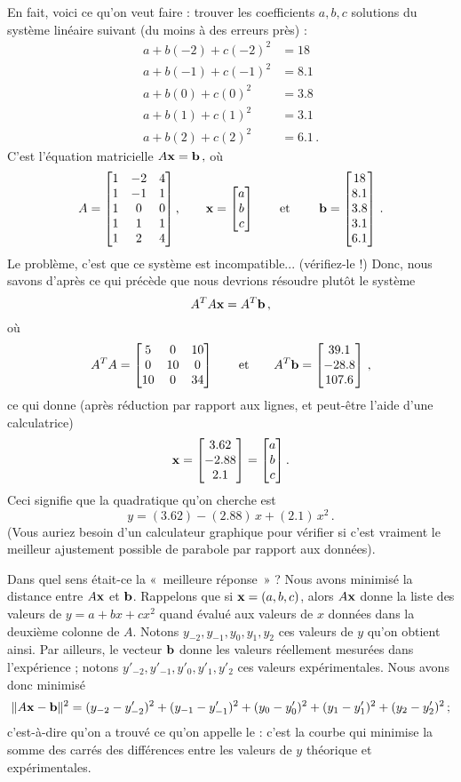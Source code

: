 \begin{myprob}
\begin{mysol}
En fait, voici ce qu'on veut faire : trouver les coefficients $a,b,c$ solutions du système linéaire suivant (du moins à des erreurs près) :
\begin{align*}
a + b(-2) + c(-2)^2 &= 18\\
a + b(-1) + c(-1)^2 &= 8.1\\
a + b(0) + c(0)^2 &= 3.8\\
a + b(1) + c(1)^2 &= 3.1\\
a+ b(2) + c(2)^2 &= 6.1\,.
\end{align*}
C'est l'équation matricielle
$
A\mathbf{x} = \mathbf{b}\,,
$
o\`u
$$
A = \left[ \begin{matrix} 1 & -2 & 4\\ 1 & -1 & 1\\ 1 & 0 & 0 \\ 1 &  1& 1\\ 1 & 2 & 4 \end{matrix} \right], \quad\quad \mathbf{x}=\left[ \begin{matrix} a\\b\\c \end{matrix} \right] \qquad\textrm{et }\qquad  \mathbf{b} = \left[ \begin{matrix} 18\\8.1\\3.8\\3.1\\6.1 \end{matrix} \right]\,.
$$
Le problème, c'est que ce système est incompatible... (vérifiez-le !)
Donc, nous savons d'après ce qui précède que nous devrions résoudre plutôt le système 
$$
A^TA \mathbf{x} = A^T\mathbf{b}\,,
$$
o\`u
$$
A^TA = \left[ \begin{matrix} 5&0&10\\0&10&0\\10&0&34 \end{matrix} \right]
\qquad
\textrm{et} 
\qquad 
A^T\mathbf{b} = \left[ \begin{matrix} 39.1\\-28.8\\107.6 \end{matrix} \right]\,,
$$
ce qui donne (après réduction par rapport aux lignes, et peut-être l'aide d'une calculatrice)
$$
\mathbf{x} = \left[ \begin{matrix} 3.62\\-2.88\\2.1 \end{matrix} \right] = \left[ \begin{matrix} a\\b\\c \end{matrix} \right].
$$
Ceci signifie que la quadratique qu'on cherche est
$$
y = (3.62) - (2.88)\,x + (2.1)\, x^2\,.
$$
(Vous auriez besoin d'un calculateur graphique pour vérifier si c'est vraiment le meilleur ajustement possible de parabole par rapport aux données).
\end{mysol}\end{myprob}

Dans quel sens était-ce la «~meilleure réponse~» ?  Nous avons minimisé la distance entre
$A\mathbf{x}$ et $\mathbf{b}$.  Rappelons que si $\mathbf{x} = (a,b,c)$, alors $A\mathbf{x}$ donne
la liste des valeurs de $y=a+bx+cx^2$ quand \'evalu\'e aux valeurs de $x$ données dans la deuxième colonne de $A$. Notons $y_{-2}, y_{-1}, y_0, y_1, y_2$ ces valeurs de $y$ qu'on obtient ainsi.
 Par ailleurs, le vecteur $\mathbf{b}$
donne les valeurs réellement mesurées dans l'expérience ; notons $y'_{-2}, y'_{-1}, y'_0, y'_1, y'_2$ ces valeurs expérimentales.
Nous avons donc minimisé
$$
\Vert A\mathbf{x} - \mathbf{b} \Vert^2 = (y_{-2}-y'_{-2})^2 + (y_{-1}-y'_{-1})^2 + (y_0-y'_0)^2 + (y_1-y'_1)^2 + (y_2-y'_2)^2\,;
$$
c'est-à-dire qu'on a trouvé ce qu'on appelle le  : c'est  la courbe qui minimise la somme des carrés
des différences entre les valeurs de $y$ théorique et expérimentales.

